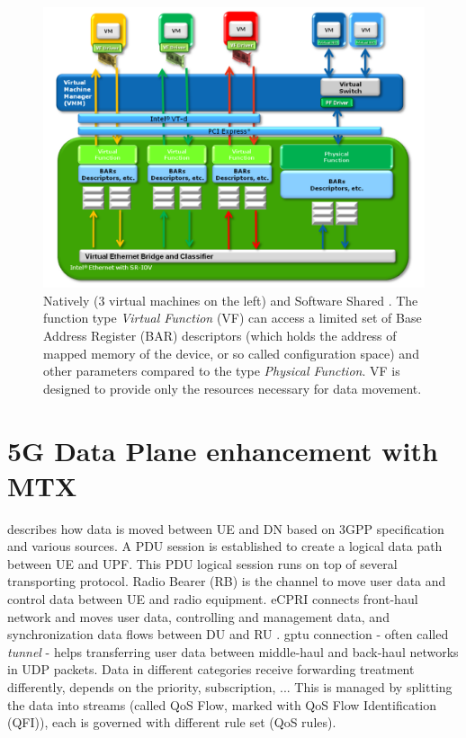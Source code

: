 \begin{figure}[H]
	\centering
	\includegraphics[width=1.0\textwidth]{resources/images/intel_sriov_Natively_and_Software_Shared.PNG}
	\caption{Natively (3 virtual machines on the left) and Software Shared \cite{intel_sriov}. The function type \textit{Virtual Function} (VF) can access a limited set of Base Address Register (BAR) descriptors (which holds the address of mapped memory of the device, or so called configuration space) and other parameters compared to the type \textit{Physical Function}. VF is designed to provide only the resources necessary for data movement.}
    \label{fig:related_work:intel_sriov_Natively_and_Software_Shared}
\end{figure}



\section{5G Data Plane enhancement with MTX}
\label{sec:related_work:5g_dataplane_enhancement}
 describes how data is moved between \ac{UE} and \ac{DN} based on 3GPP specification and various sources.
A \ac{PDU} session is established to create a logical data path between \ac{UE} and \ac{UPF}.
This \ac{PDU} logical session runs on top of several transporting protocol.
Radio Bearer (RB) is the channel to move user data and control data between UE and radio equipment.
\ac{eCPRI} connects front-haul network and moves user data, controlling and management data, and synchronization data flows between DU and RU \cite{eCPRI_spec}.
\ac{gptu} connection - often called \textit{tunnel} - helps transferring user data between middle-haul and back-haul networks in UDP packets.
Data in different categories receive forwarding treatment differently, depends on the priority, subscription, ... 
This is managed by splitting the data into streams (called \ac{QoS} Flow, marked with QoS Flow Identification (QFI)), each is governed with different rule set (QoS rules).


